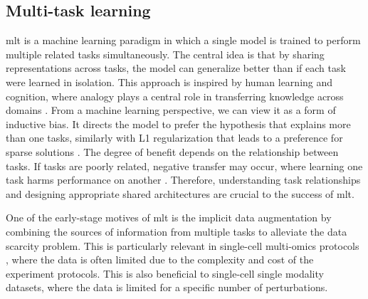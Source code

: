 \documentclass[12pt, a4paper]{article}
\begin{document}


\subsection{Multi-task learning}

\gls{mlt} is a machine learning paradigm in which a single model is trained to perform multiple related tasks simultaneously. The central idea is that by sharing representations across tasks, the model can generalize better than if each task were learned in isolation. This approach is inspired by human learning and cognition, where analogy plays a central role in transferring knowledge across domains \cite{hofstadter2001analogy, zhangSurveyMultiTaskLearning2021}. From a machine learning perspective, we can view it as a form of inductive bias. It directs the model to prefer the hypothesis that explains more than one tasks, similarly with L1 regularization that leads to a preference for sparse solutions \cite{ruderOverviewMultiTaskLearning2017}. The degree of benefit depends on the relationship between tasks. If tasks are poorly related, negative transfer may occur, where learning one task harms performance on another \cite{standleyWhichTasksShould2020}. Therefore, understanding task relationships and designing appropriate shared architectures are crucial to the success of \gls{mlt}.


One of the early-stage motives of \gls{mlt} is the implicit data augmentation by combining the sources of information from multiple tasks to alleviate the data scarcity problem. This is particularly relevant in single-cell multi-omics protocols \cite{caoScButterflyVersatileSinglecell2024}, where the data is often limited due to the complexity and cost of the experiment protocols. This is also beneficial to single-cell single modality datasets, where the data is limited for a specific number of perturbations.
\end{document}
